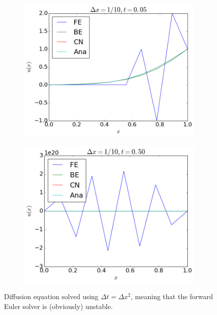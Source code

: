\documentclass[12pt, a4paper]{article}
\begin{document}
\begin{figure}[ht!]
	\centering 
 	\begin{subfigure}[b]{0.495\textwidth}
		\includegraphics[width=\textwidth]{../Programs/Output/Diffusion_1d_t1_u.png}
  	\end{subfigure}
  	\begin{subfigure}[b]{0.495\textwidth}
		\includegraphics[width=\textwidth]{../Programs/Output/Diffusion_1d_t2_u.png}
  	\end{subfigure}	
  	\caption{Diffusion equation solved using $\Delta t = \Delta x^2$, meaning that the forward Euler 
  	solver is (obviously) unstable.}
  	\label{fig:1d_unstable}
\end{figure}
\end{document}
